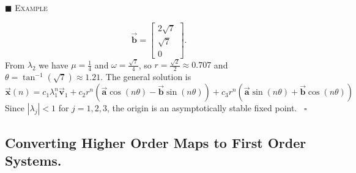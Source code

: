 \documentclass[reqno]{immbook}
\newcommand{\BA}{\vec{\textbf{a}}}
\newcommand{\BB}{\vec{\textbf{b}}}
\newcommand{\BV}{\vec{\textbf{v}}}
\newcommand{\BX}{\vec{\textbf{x}}}
\numberwithin{equation}{chapter}
\numberwithin{question}{section}
\numberwithin{theorem}{chapter}
\numberwithin{figure}{chapter}
\theoremstyle{definition}
\newenvironment{xexample}%
{%

\medskip\noindent\addtocounter{example}{1}$\blacksquare$ \textsc{Example \theexample}\hspace*{1em}%
}%
{%
~\hfill$\square$

\medskip
}
\begin{document}
\begin{xexample}
\begin{equation}
    \BB = \begin{bmatrix} 2\sqrt{7} \\ \sqrt{7} \\ 0\end{bmatrix}.
\end{equation}
From $\lambda_2$ we have $\mu = \frac{1}{4}$ and
$\omega = \frac{\sqrt{7}}{4}$, so
$r = \frac{\sqrt{2}}{2} \approx 0.707$ and $\theta = \tan^{-1}(\sqrt{7}) \approx 1.21$.
The general solution is
\begin{equation}
  \BX(n) = c_1 \lambda_1^n \BV_1 +
          c_2 r^n\left(\BA\cos(n\theta) - \BB\sin(n\theta)\right) +
          c_3 r^n\left(\BA\sin(n\theta) + \BB\cos(n\theta)\right) 
\end{equation}
Since
$|\lambda_j| < 1$ for $j=1,2,3$,
the origin is an
asymptotically stable fixed point.
\end{xexample}

\subsection*{Converting Higher Order Maps to First Order Systems.}
\end{document}
